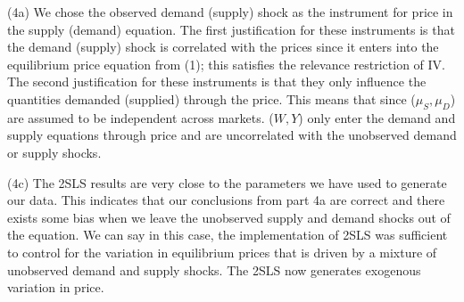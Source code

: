 \documentclass[12pt]{article}
\begin{document}
(4a) We chose the observed demand (supply) shock as the instrument for price in the supply (demand) equation. The first justification for these instruments is that the demand (supply) shock is correlated with the prices since it enters into the equilibrium price equation from (1); this satisfies the relevance restriction of IV. The second justification for these instruments is that they only influence the quantities demanded (supplied) through the price. This means that since ($\mu_S, \mu_D$) are assumed to be independent across markets. ($W,Y$) only enter the demand and supply equations through price and are uncorrelated with the unobserved demand or supply shocks. 

(4c) The 2SLS results are very close to the parameters we have used to generate our data. This indicates that our conclusions from part 4a are correct and there exists some bias when we leave the unobserved supply and demand shocks out of the equation. We can say in this case, the implementation of 2SLS was sufficient to control for the variation in equilibrium prices that is driven by a mixture of unobserved demand and supply shocks. The 2SLS now generates exogenous variation in price.
\newpage
\end{document}
